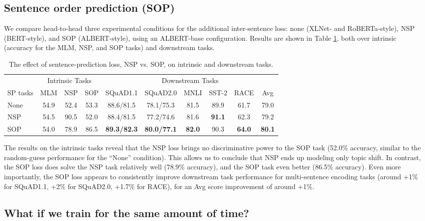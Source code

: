 \vspace{-5pt}

\subsection{Sentence order prediction (SOP)}
\label{sec:sop}
We compare head-to-head three experimental conditions for the additional inter-sentence loss: none (XLNet- and RoBERTa-style), NSP (BERT-style), and SOP (ALBERT-style), using an ALBERT-base configuration.
Results are shown in Table \ref{table:sop}, both over intrinsic (accuracy for the MLM, NSP, and SOP tasks) and downstream tasks.

\begin{table}[!htbp] 
\small
\centering
\begin{tabular}{ l | c c c | c c c c  c | c }
&\multicolumn{3}{|c|}{Intrinsic Tasks} & \multicolumn{6}{c}{Downstream Tasks} \\
SP tasks	    	&MLM	&NSP & SOP &SQuAD1.1	&SQuAD2.0	&MNLI	&SST-2	&RACE & Avg \\
\hline
None &54.9 &52.4 & 53.3 &88.6/81.5	&78.1/75.3	&81.5	&89.9	&61.7		& 79.0 \\
NSP	 &54.5 &90.5 & 52.0 &88.4/81.5	&77.2/74.6	&81.6	&\textbf{91.1}	&62.3	& 79.2  \\
SOP	 &54.0 &78.9 &86.5  &\textbf{89.3/82.3}	&\textbf{80.0/77.1}	&\textbf{82.0}	&90.3	&\textbf{64.0}	 & \textbf{80.1}	\\
\end{tabular}
\caption{The effect of sentence-prediction loss, NSP vs. SOP, on intrinsic and downstream tasks.}
\label{table:sop}
\end{table}

The results on the intrinsic tasks reveal that the NSP loss brings no discriminative power to the SOP task (52.0\% accuracy, similar to the random-guess performance for the ``None'' condition).
This allows us to conclude that NSP ends up modeling only topic shift.
In contrast, the SOP loss does solve the NSP task relatively well (78.9\% accuracy), and the SOP task even better (86.5\% accuracy).
Even more importantly, the SOP loss appears to consistently improve downstream task performance for multi-sentence encoding tasks (around +1\% for SQuAD1.1, +2\% for SQuAD2.0, +1.7\% for RACE), for an Avg score improvement of around +1\%.

\subsection{What if we train for the same amount of time?}

